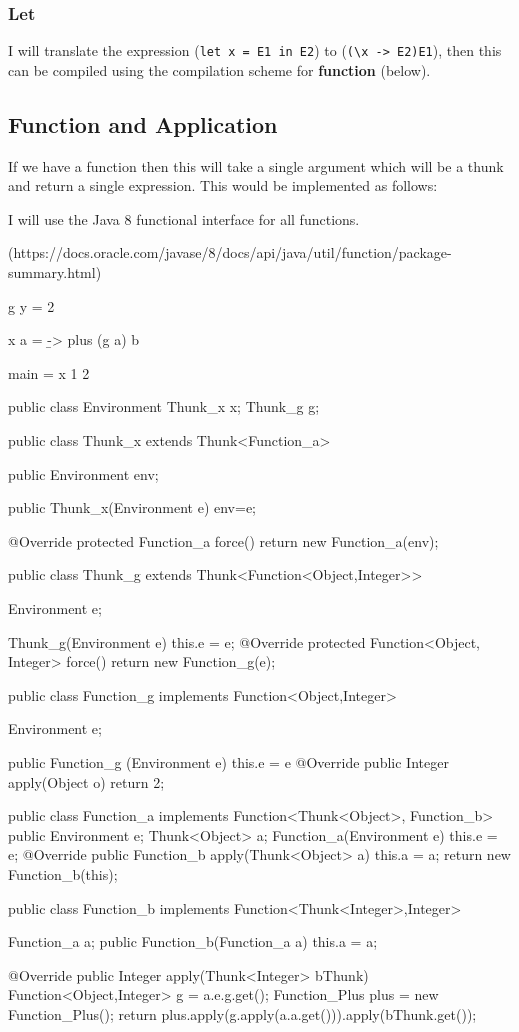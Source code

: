\documentclass[12pt,a4paper,twoside]{article}
\begin{document}
\subsubsection{Let} 

I will translate the expression (\texttt{let x = E1 in E2}) to (\texttt{(\textbackslash x -> E2)E1}), then 
this can be compiled using the compilation scheme for \textbf{function} (below).

\subsection{Function and Application}

If we have a function then this will take a single argument which will be a thunk and return a single expression. 
This would be implemented as follows:

I will use the Java 8 functional interface for all functions.

(https://docs.oracle.com/javase/8/docs/api/java/util/function/package-summary.html)

\begin{HaskellLst}
g y = 2
  
x a = \b -> plus (g a) b

main = x 1 2
\end{HaskellLst}

\begin{JavaLst}
public class Environment {
    Thunk_x x;
    Thunk_g g;
}

public class Thunk_x extends Thunk<Function_a>{
    public Environment env;

    public Thunk_x(Environment e) {env=e;}

    @Override
    protected Function_a force() {
        return new Function_a(env);
    }
}

public class Thunk_g extends Thunk<Function<Object,Integer>> {
    Environment e;

    Thunk_g(Environment e) {
        this.e = e;
    }
    @Override
    protected Function<Object, Integer> force() {
        return new Function_g(e);
    }
}

public class Function_g implements Function<Object,Integer> {
    Environment e;

    public Function_g (Environment e) {
      this.e = e
    }
    @Override
    public Integer apply(Object o) {
        return 2;
    }
}

public class Function_a implements Function<Thunk<Object>, Function_b> {
    public Environment e;
    Thunk<Object>  a;
    Function_a(Environment e) {
        this.e = e;
    }
    @Override
    public Function_b apply(Thunk<Object> a) {
        this.a = a;
        return new Function_b(this);
    }
}

public class Function_b implements Function<Thunk<Integer>,Integer>{
    Function_a a;
    public Function_b(Function_a a) {
        this.a = a;
    }

    @Override
    public Integer apply(Thunk<Integer> bThunk) {
        Function<Object,Integer> g = a.e.g.get();
        Function_Plus plus = new Function_Plus();
        return plus.apply(g.apply(a.a.get())).apply(bThunk.get());
    }
}
\end{JavaLst}
\end{document}
